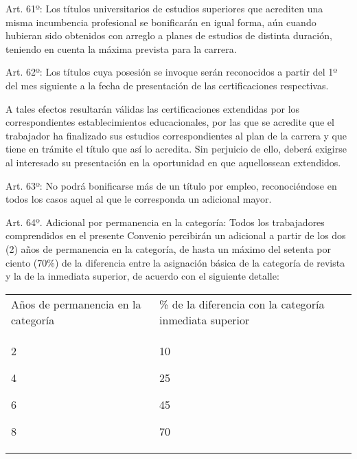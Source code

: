 \documentclass[]{article}
\begin{document}
Art. 61º: Los títulos universitarios de estudios superiores que
acrediten una misma incumbencia profesional se bonificarán en igual
forma, aún cuando hubieran sido obtenidos con arreglo a planes de
estudios de distinta duración, teniendo en cuenta la máxima prevista
para la carrera.

Art. 62º: Los títulos cuya posesión se invoque serán reconocidos a
partir del 1º del mes siguiente a la fecha de presentación de las
certificaciones respectivas.

A tales efectos resultarán válidas las certificaciones extendidas por
los correspondientes establecimientos educacionales, por las que se
acredite que el trabajador ha finalizado sus estudios correspondientes
al plan de la carrera y que tiene en trámite el título que así lo
acredita. Sin perjuicio de ello, deberá exigirse al interesado su
presentación en la oportunidad en que aquellossean extendidos.

Art. 63º: No podrá bonificarse más de un título por empleo,
reconociéndose en todos los casos aquel al que le corresponda un
adicional mayor.

Art. 64º. Adicional por permanencia en la categoría: Todos los
trabajadores comprendidos en el presente Convenio percibirán un
adicional a partir de los dos (2) años de permanencia en la categoría,
de hasta un máximo del setenta por ciento (70\%) de la diferencia entre
la asignación básica de la categoría de revista y la de la inmediata
superior, de acuerdo con el siguiente detalle:

\begin{longtable}[c]{@{}ll@{}}
\toprule
\begin{minipage}[t]{0.47\columnwidth}\raggedright\strut
Años de permanencia en la categoría
\strut\end{minipage} &
\begin{minipage}[t]{0.47\columnwidth}\raggedright\strut
\% de la diferencia con la categoría inmediata superior
\strut\end{minipage}\tabularnewline
\begin{minipage}[t]{0.47\columnwidth}\raggedright\strut
2

4

6

8
\strut\end{minipage} &
\begin{minipage}[t]{0.47\columnwidth}\raggedright\strut
10

25

45

70
\strut\end{minipage}\tabularnewline
\bottomrule
\end{longtable}
\end{document}
